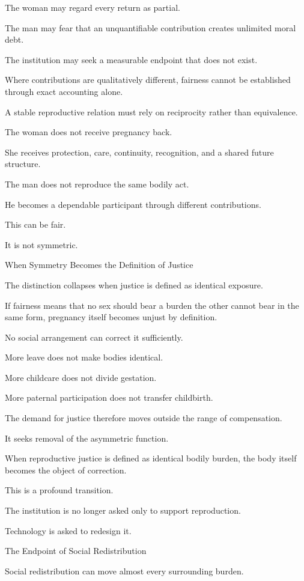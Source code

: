 The woman may regard every return as partial.

The man may fear that an unquantifiable contribution creates unlimited moral debt.

The institution may seek a measurable endpoint that does not exist.

Where contributions are qualitatively different, fairness cannot be established through exact accounting alone.

A stable reproductive relation must rely on reciprocity rather than equivalence.

The woman does not receive pregnancy back.

She receives protection, care, continuity, recognition, and a shared future structure.

The man does not reproduce the same bodily act.

He becomes a dependable participant through different contributions.

This can be fair.

It is not symmetric.

When Symmetry Becomes the Definition of Justice

The distinction collapses when justice is defined as identical exposure.

If fairness means that no sex should bear a burden the other cannot bear in the same form, pregnancy itself becomes unjust by definition.

No social arrangement can correct it sufficiently.

More leave does not make bodies identical.

More childcare does not divide gestation.

More paternal participation does not transfer childbirth.

The demand for justice therefore moves outside the range of compensation.

It seeks removal of the asymmetric function.

When reproductive justice is defined as identical bodily burden, the body itself becomes the object of correction.

This is a profound transition.

The institution is no longer asked only to support reproduction.

Technology is asked to redesign it.

The Endpoint of Social Redistribution

Social redistribution can move almost every surrounding burden.

